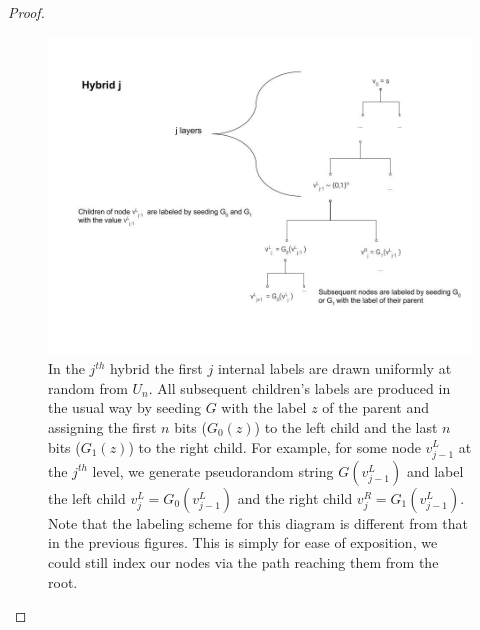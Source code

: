 \begin{proof}
\begin{figure}
\centering
\includegraphics[width=\textwidth, height=0.25\paperheight, keepaspectratio]{../figure/hybrid_j_thm_5-1.jpg}
\caption{In the \(j^{th}\) hybrid the first \(j\) internal labels are
drawn uniformly at random from \(U_{n}\). All subsequent children's
labels are produced in the usual way by seeding \(G\) with the label
\(z\) of the parent and assigning the first \(n\) bits (\(G_{0}(z)\)) to
the left child and the last \(n\) bits (\(G_{1}(z)\)) to the right
child. For example, for some node \(v^{L}_{j-1}\) at the \(j^{th}\)
level, we generate pseudorandom string \(G(v^{L}_{j-1})\) and label the
left child \(v^{L}_{j} = G_{0}(v^{L}_{j-1})\) and the right child
\(v^{R}_{j} = G_{1}(v^{L}_{j-1})\). Note that the labeling scheme for
this diagram is different from that in the previous figures. This is
simply for ease of exposition, we could still index our nodes via the
path reaching them from the root.}
\label{hybridj}
\end{figure}


\end{proof}
